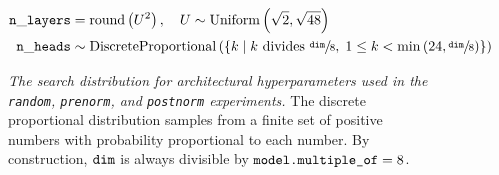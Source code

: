 \begin{figure}
    \centering
    \begin{align*}
        \mathtt{n\_layers} &= \operatorname{round}\left(U^2\right),\quad U \sim\operatorname{Uniform}\left(\sqrt{2}, \sqrt{48}\right) \\
        \mathtt{n\_heads}  &\sim \operatorname{DiscreteProportional}\left(\left\{k \mid k \text{ divides } \sfrac{\mathtt{dim}}{8},\; 1 \leq k < \min\left(24, \sfrac{\mathtt{dim}}{8}\right)\right\}\right) \\
    \end{align*}
    \caption{
        \emph{The search distribution for architectural hyperparameters used in the \texttt{random}, \texttt{prenorm}, and \texttt{postnorm} experiments.} The discrete proportional distribution samples from a finite set of positive numbers with probability proportional to each number. By construction, $\mathtt{dim}$ is always divisible by $\text{\texttt{model.multiple\_of}} = 8$.
    }
    \label{fig:search-distribution_architectural}
\end{figure}

